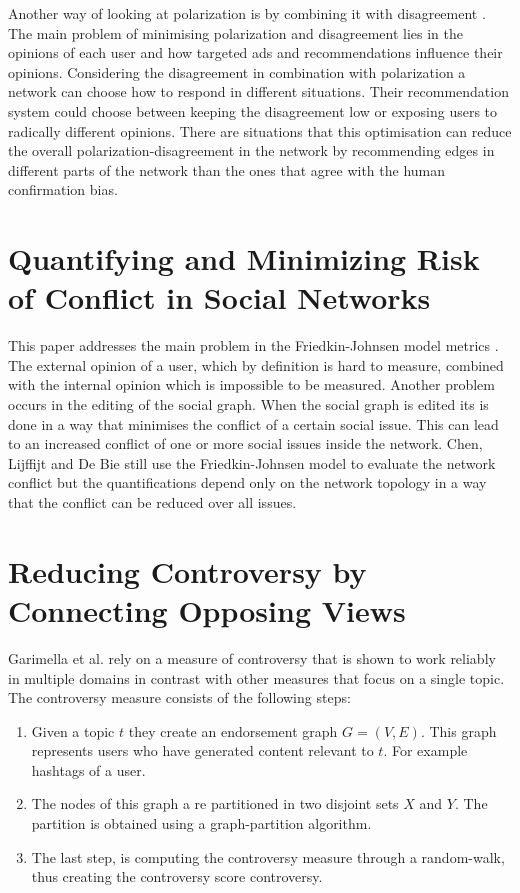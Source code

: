 Another way of looking at polarization is by combining it with disagreement \cite{musco}. The main problem of minimising polarization and disagreement lies in the opinions of each user and how targeted ads and recommendations influence their opinions.
Considering the disagreement in combination with polarization a network can choose how to respond in different situations. Their recommendation system could choose between keeping the disagreement low or exposing users to radically different opinions. 
There are situations that this optimisation can reduce the overall polarization-disagreement in the network by recommending edges in different parts of the network than the ones that agree with the human confirmation bias.

\section{Quantifying and Minimizing Risk of Conflict in Social Networks}
\label{sec:riskOfConflict}

This paper addresses the main problem in the Friedkin-Johnsen model metrics \cite{chen}. The external opinion of a user, which by definition is hard to measure, combined with the internal opinion which is impossible to be measured. Another problem occurs in the editing of the social graph. When the social graph is edited its is done in a way that minimises the conflict of a certain social issue. This can lead to an increased conflict of one or more social issues inside the network. Chen, Lijffijt and De Bie still use the Friedkin-Johnsen model to evaluate the network conflict but the quantifications depend only on the network topology in a way that the conflict can be reduced over all issues. 

\section{Reducing Controversy by Connecting Opposing Views}
\label{sec:reducing}

Garimella et al. \cite{garimella} rely on a measure of controversy that is shown to work reliably in multiple domains in contrast with other measures that focus on a single topic. The controversy measure consists of the following steps:

\begin{enumerate}
  \item Given a topic $t$ they create an endorsement graph $G=(V,E)$. This graph represents users who have generated content relevant to $t$. For example hashtags of a user.
  
  \item The nodes of this graph a re partitioned in two disjoint sets $X$ and $Y$. The partition is obtained using a graph-partition algorithm.
  
  \item The last step, is computing the controversy measure through a random-walk, thus creating the controversy score controversy. 
\end{enumerate}
\vspace{4pt}

